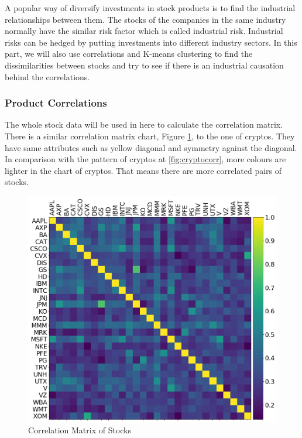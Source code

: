 \documentclass[11pt]{article} %
\theoremstyle{plain}
\theoremstyle{definition}
\begin{document}
A popular way of diversify investments in stock products is to find the industrial relationships between them. The stocks of the companies in the same industry normally have the similar risk factor which is called industrial risk. Industrial risks can be hedged by putting investments into different industry sectors. In this part, we will also use correlations and K-means clustering to find the dissimilarities between stocks and try to see if there is an industrial causation behind the correlations.

\subsubsection{Product Correlations}

The whole stock data will be used in here to calculate the correlation matrix. There is a similar correlation matrix chart, Figure \ref{fig:stockcorr}, to the one of cryptos. They have same attributes such as yellow diagonal and symmetry against the diagonal. In comparison with the pattern of cryptos at \ref{fig:cryptocorr}, more colours are lighter in the chart of cryptos. That means there are more correlated pairs of stocks.

\begin{figure}[ht]
    \includegraphics[width=1\linewidth, center]{resources/stock_corr.png}
    \caption{Correlation Matrix of Stocks}
    \label{fig:stockcorr}
\end{figure}
\end{document}
